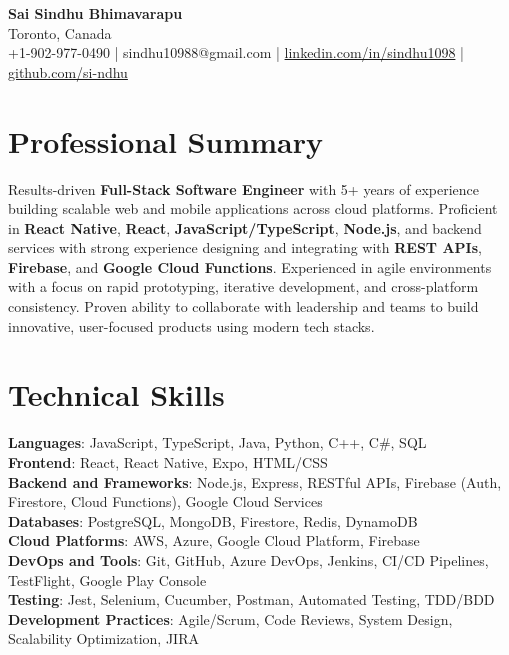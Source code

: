\documentclass[letterpaper,11pt]{article}
\begin{document}
\begin{center}
  {\Large \textbf{Sai Sindhu Bhimavarapu}} \\
  Toronto, Canada \\
  +1-902-977-0490 \enspace | \enspace sindhu10988@gmail.com \enspace | \enspace \href{https://www.linkedin.com/in/sindhu1098/}{linkedin.com/in/sindhu1098} \enspace | \enspace \href{https://github.com/si-ndhu}{github.com/si-ndhu}
\end{center}

\section{Professional Summary}
  \begin{itemize}[leftmargin=0.15in, label={}]
    \small{\item{
     Results-driven \textbf{Full-Stack Software Engineer} with 5+ years of experience building scalable web and mobile applications across cloud platforms. Proficient in \textbf{React Native}, \textbf{React}, \textbf{JavaScript/TypeScript}, \textbf{Node.js}, and backend services with strong experience designing and integrating with \textbf{REST APIs}, \textbf{Firebase}, and \textbf{Google Cloud Functions}. Experienced in agile environments with a focus on rapid prototyping, iterative development, and cross-platform consistency. Proven ability to collaborate with leadership and teams to build innovative, user-focused products using modern tech stacks.
    }}
  \end{itemize}
\vspace{-16pt}

\section{Technical Skills}
 \begin{itemize}[leftmargin=0.15in, label={}]
    \small{\item{
     \textbf{Languages}: JavaScript, TypeScript, Java, Python, C++, C\#, SQL \\
     \textbf{Frontend}: React, React Native, Expo, HTML/CSS \\
     \textbf{Backend and Frameworks}: Node.js, Express, RESTful APIs, Firebase (Auth, Firestore, Cloud Functions), Google Cloud Services \\
     \textbf{Databases}: PostgreSQL, MongoDB, Firestore, Redis, DynamoDB \\
     \textbf{Cloud Platforms}: AWS, Azure, Google Cloud Platform, Firebase \\
     \textbf{DevOps and Tools}: Git, GitHub, Azure DevOps, Jenkins, CI/CD Pipelines, TestFlight, Google Play Console \\
     \textbf{Testing}: Jest, Selenium, Cucumber, Postman, Automated Testing, TDD/BDD \\
     \textbf{Development Practices}: Agile/Scrum, Code Reviews, System Design, Scalability Optimization, JIRA
    }}
 \end{itemize}
\vspace{-16pt}
\end{document}
